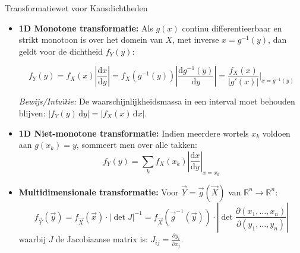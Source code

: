 \documentclass[11pt,a4paper]{article}
\newcommand{\dd}{\mathrm{d}}
\begin{document}
\begin{theobox}{Transformatiewet voor Kansdichtheden}
\begin{itemize}[leftmargin=1.2em]
    \item \textbf{1D Monotone transformatie:} Als $g(x)$ continu differentieerbaar en strikt monotoon is over het domein van $X$, met inverse $x = g^{-1}(y)$, dan geldt voor de dichtheid $f_Y(y)$:
    \begin{formulabox}
    \begin{equation}
        f_Y(y) = f_X(x) \left| \frac{\dd x}{\dd y} \right| = f_X(g^{-1}(y)) \left| \frac{\dd g^{-1}(y)}{\dd y} \right| = \frac{f_X(x)}{\left| g'(x) \right|}\Bigg|_{x = g^{-1}(y)}
    \end{equation}
    \end{formulabox}
    \emph{Bewijs/Intuïtie:} De waarschijnlijkheidsmassa in een interval moet behouden blijven: $|f_Y(y) \, \dd y| = |f_X(x) \, \dd x|$.
    \item \textbf{1D Niet-monotone transformatie:} Indien meerdere wortels $x_k$ voldoen aan $g(x_k) = y$, sommeert men over alle takken:
    \begin{equation}
        f_Y(y) = \sum_{k} f_X(x_k) \left| \frac{\dd x}{\dd y} \right|_{x = x_k}
    \end{equation}
    \item \textbf{Multidimensionale transformatie:} Voor $\vec{Y} = \vec{g}(\vec{X})$ van $\mathbb{R}^n \to \mathbb{R}^n$:
    \begin{equation}
        f_{\vec{Y}}(\vec{y}) = f_{\vec{X}}(\vec{x}) \cdot |\det J|^{-1} = f_{\vec{X}}(\vec{g}^{-1}(\vec{y})) \cdot \left| \det \frac{\partial (x_1, \ldots, x_n)}{\partial (y_1, \ldots, y_n)} \right|
    \end{equation}
    waarbij $J$ de Jacobiaanse matrix is: $J_{ij} = \frac{\partial y_i}{\partial x_j}$.
\end{itemize}
\end{theobox}
\end{document}
